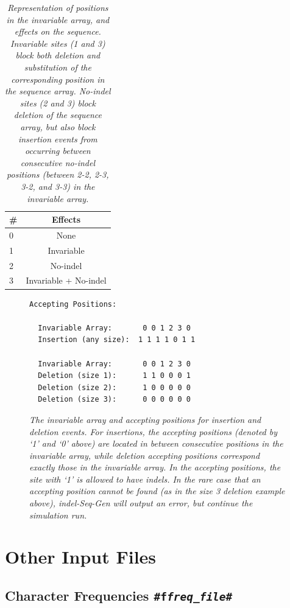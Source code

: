 \documentclass[10pt]{article}
\begin{document}
\begin{table}[Htbp]
\caption{\textit{Representation of positions in the invariable array, and effects on the sequence. Invariable sites (1 and 3) block both deletion and substitution of the corresponding position in the sequence array.  No-indel sites (2 and 3) block deletion of the sequence array, but also block insertion events from occurring between consecutive no-indel positions (between 2-2, 2-3, 3-2, and 3-3) in the invariable array.}}
\centering
\begin{tabular}{|l|c|}
\hline
\# & Effects \\
\hline
0 & None \\
1 & Invariable \\
2 & No-indel \\
3 & Invariable + No-indel  \\
\hline
\end{tabular}
\label{tab:invariable}
\end{table}

\begin{figure}[Htbp]
\begin{verbatim}
Accepting Positions:

  Invariable Array:       0 0 1 2 3 0
  Insertion (any size):  1 1 1 1 0 1 1

  Invariable Array:       0 0 1 2 3 0
  Deletion (size 1):      1 1 0 0 0 1
  Deletion (size 2):      1 0 0 0 0 0
  Deletion (size 3):      0 0 0 0 0 0

\end{verbatim}
\caption{\textit{The invariable array and accepting positions for insertion and deletion events. For insertions, the accepting positions (denoted by `1' and `0' above) are located in between consecutive positions in the invariable array, while deletion accepting positions correspond exactly those in the invariable array.  In the accepting positions, the site with `1' is allowed to have indels. In the rare case that an accepting position cannot be found (as in the size 3 deletion example above), indel-Seq-Gen will output an error, but continue the simulation run.}}
\label{fig:placement}
\end{figure}

\section{Other Input Files}

\subsection{Character Frequencies {\tt \#f{\it freq\_file}\#}}
\end{document}
